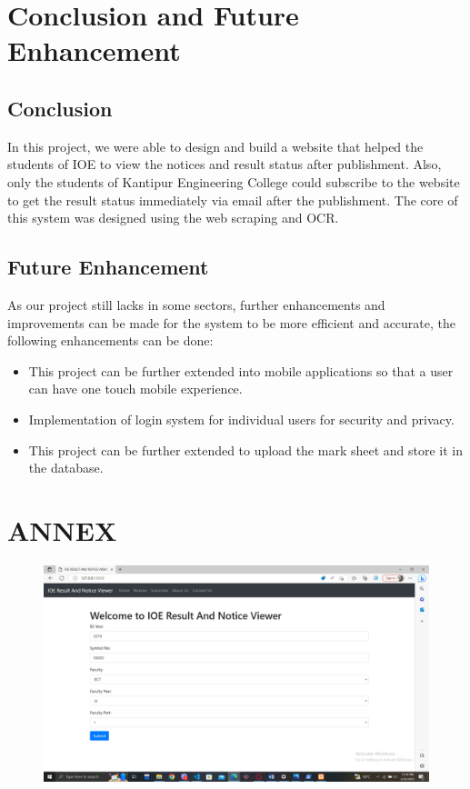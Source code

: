 \chapter{Conclusion and Future Enhancement}
\section{Conclusion}
In this project, we were able to design and build a website that helped the students of 
IOE to view the notices and result status after publishment. Also, only the students of 
Kantipur Engineering College could subscribe to the website to get the result status 
immediately via email after the publishment. The core of this system was designed 
using the web scraping and OCR. 

\section{Future Enhancement}
As our project still lacks in some sectors, further enhancements and improvements can
be made for the system to be more efficient and accurate, the following enhancements
can be done:

\begin{itemize}
	\item This project can be further extended into mobile applications so that a user can 
have one touch mobile experience.
	\item Implementation of login system for individual users for security and privacy.
	\item This project can be further extended to upload the mark sheet and store it in the 
database.
	

\end{itemize}

\newpage
\renewcommand\bibname{REFERENCES} %

\chapter*{ANNEX}
\begin{figure}[h]
    \centering
    \includegraphics[scale=0.2]{pictures/1.png}
\end{figure}


